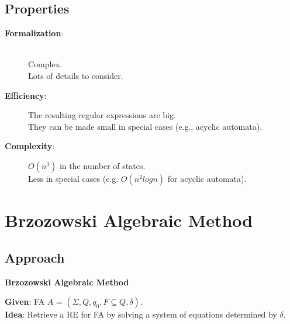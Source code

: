 \documentclass{beamer}
\begin{document}
\subsection*{Properties}
\begin{frame}
    \begin{description}
        \item[\textbf{Formalization}:] \hfill \\
            Complex.\\
            Lots of details to consider.
        \item[\textbf{Efficiency}:] 
            The resulting regular expressions are big.\\
            They can be made small in special cases (e.g., acyclic automata).

        \item[\textbf{Complexity}:]
            $O(n^3)$ in the number of states.\\
            Less in special cases (e.g. $O(n^2 log n)$ for acyclic automata).
    \end{description}
\end{frame}

\section{Brzozowski Algebraic Method}
\subsection*{Approach}
\begin{frame}
    \textbf{Brzozowski Algebraic Method}

    \textbf{Given}: FA $A$ = $(\Sigma, Q, q_0, F \subseteq Q, \delta)$.\\
    \textbf{Idea}: Retrieve a RE for FA by solving a system of equations determined by $\delta$.

\end{frame}
\end{document}
